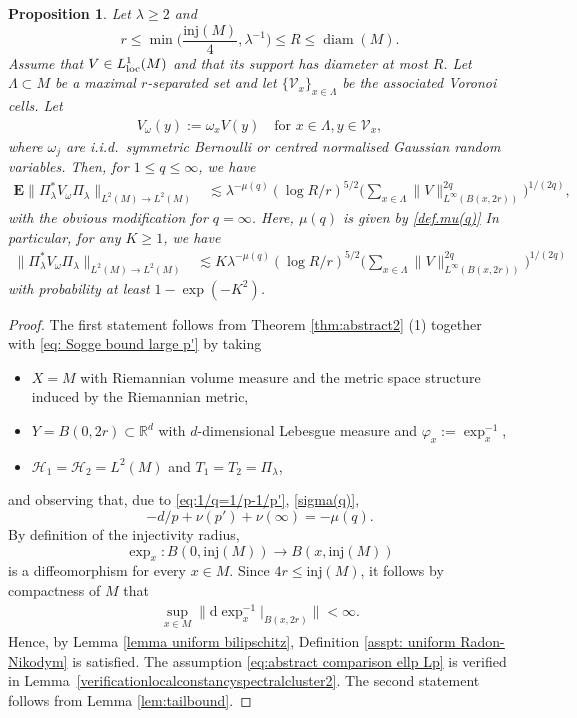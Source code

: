\documentclass[12pt,reqno]{amsart}
\newtheorem{proposition}[theorem]{Proposition}
\theoremstyle{definition}
\theoremstyle{remark}
\numberwithin{equation}{section}
\newcommand{\1}{\mathbbm{1}}
\newcommand{\loc}{{\rm loc}}
\renewcommand{\phi}{\varphi}
\newcommand{\R}{\mathbb{R}}
\DeclareMathOperator{\diam}{diam}
\def\rd{\mathrm{d}}
\begin{document}
\begin{proposition}\label{prop: manifold spectral cluster expectation}
  Let $\lambda\geq 2$ and 
  $$
  r\leq \min\Big(\frac{\mathrm{inj}(M)}{4},\lambda^{-1}\Big)\leq R\leq \diam(M).
  $$
  Assume that $V\in L^1_{\rm \loc}(M)$ and that its support has diameter at most $R$. Let $\Lambda\subset M$ be a maximal $r$-separated set and let $\{\mathcal{V}_x\}_{x\in\Lambda}$ be the associated Voronoi cells. Let
  \begin{align*}
    V_{\omega}(y):=\omega_xV(y)\quad\mbox{for }x\in \Lambda,y\in \mathcal{V}_x,
  \end{align*}
  where $\omega_j$ are i.i.d.~symmetric Bernoulli or centred normalised Gaussian random variables. Then, for $1\leq q\leq\infty$, we have
  \begin{align*}
    \mathbf{E}\|\Pi_{\lambda} ^*V_{\omega}\Pi_{\lambda} \|_{L^2(M)\to L^2(M)}
    & \lesssim \lambda^{-\mu(q)}(\log R/r )^{5/2}\Big(\sum_{x\in\Lambda}\|V\|_{L^{\infty}(B(x,2r))}^{2q}\Big)^{1/(2q)},
  \end{align*}    
  with the obvious modification for $q=\infty$. Here, $\mu(q)$ is given by \eqref{def.mu(q)}
In particular, for any $K\geq 1$, we have
  \begin{align*}
    \|\Pi_{\lambda} ^*V_{\omega}\Pi_{\lambda} \|_{L^2(M)\to L^2(M)}
    & \lesssim K \lambda^{-\mu(q)}(\log R/r )^{5/2}\Big(\sum_{x\in\Lambda}\|V\|_{L^{\infty}(B(x,2r))}^{2q}\Big)^{1/(2q)}
  \end{align*} 
 with probability at least $1-\exp(-K^2)$. 
\end{proposition}

\begin{proof}
  The first statement follows from Theorem \ref{thm:abstract2} (1) together with \eqref{eq: Sogge bound large p'} by taking
  \begin{itemize}
  \item $X=M$ with Riemannian volume measure and the metric space structure induced by the Riemannian metric,
  \item $Y=B(0,2r)\subset \R^d$ with $d$-dimensional Lebesgue measure and $\phi_x:=\exp_x^{-1}$,
  \item $\mathcal{H}_1=\mathcal{H}_2=L^2(M)$ and $T_1=T_2=\Pi_{\lambda}$, 
  \end{itemize}
  and observing that, due to \eqref{eq:1/q=1/p-1/p'}, \eqref{sigma(q)}, 
\[
-d/p+\nu(p')+\nu(\infty)
=
-\mu(q).
\]
  By definition of the injectivity radius, 
  $$
  \exp_x:B(0,\mathrm{inj}(M))\to B(x,\mathrm{inj}(M))
  $$
  is a diffeomorphism for every $x\in M$. Since $4r\leq \mathrm{inj}(M)$, it follows by compactness of $M$ that
  \begin{align*}
    \sup_{x\in M}\|\rd\exp_x^{-1}|_{B(x,2r)}\|<\infty.
  \end{align*}
  Hence, by Lemma \ref{lemma uniform bilipschitz}, Definition \ref{asspt: uniform Radon-Nikodym} is satisfied. The assumption \eqref{eq:abstract comparison ellp Lp} is verified in Lemma~\ref{verificationlocalconstancyspectralcluster2}.
The second statement follows from Lemma \ref{lem:tailbound}.
\end{proof}
\end{document}
